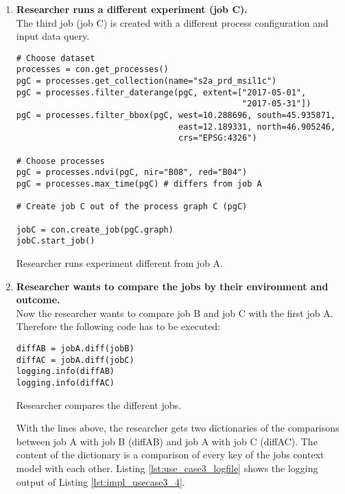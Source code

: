 \documentclass[draft,final]{vutinfth} %
\newenvironment{code}{\captionsetup{type=listing}}{}
\begin{document}
\begin{enumerate}
	\item \textbf{Researcher runs a different experiment (job C).}\\
	The third job (job C) is created with a different process configuration and input data query.

\begin{code}
	\begin{verbatim}
# Choose dataset
processes = con.get_processes()
pgC = processes.get_collection(name="s2a_prd_msil1c")
pgC = processes.filter_daterange(pgC, extent=["2017-05-01", 
                                              "2017-05-31"])
pgC = processes.filter_bbox(pgC, west=10.288696, south=45.935871, 
                                 east=12.189331, north=46.905246, 
                                 crs="EPSG:4326")
	
# Choose processes
pgC = processes.ndvi(pgC, nir="B08", red="B04")
pgC = processes.max_time(pgC) # differs from job A
	
# Create job C out of the process graph C (pgC)
	
jobC = con.create_job(pgC.graph)
jobC.start_job()
	\end{verbatim}
	\caption{Researcher runs experiment different from job A.}
	\label{lst:impl_usecase3_3}
	
\end{code}

	\item \textbf{Researcher wants to compare the jobs by their environment and outcome.}\\
	Now the researcher wants to compare job B and job C with the first job A. Therefore the following code has to be executed:
	
	\begin{code}
		\begin{verbatim}
diffAB = jobA.diff(jobB)
diffAC = jobA.diff(jobC)
logging.info(diffAB)
logging.info(diffAC)
		\end{verbatim}
		\caption{Researcher compares the different jobs.}
		\label{lst:impl_usecase3_4}
		
	\end{code}
	 
	With the lines above, the researcher gets two dictionaries of the comparisons between job A with job B (diffAB) and job A with job C (diffAC). The content of the dictionary is a comparison of every key of the jobs context model with each other. Listing \ref{lst:use_case3_logfile} shows the logging output of Listing \ref{lst:impl_usecase3_4}.
\end{enumerate}
\end{document}
